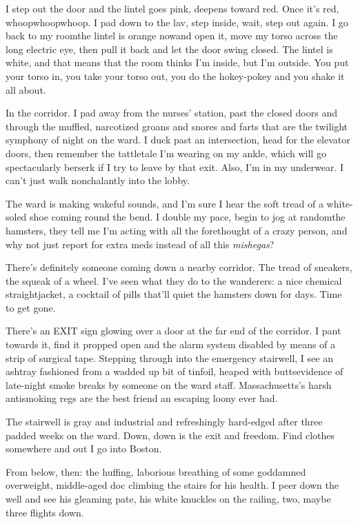 I step out the door and the lintel goes pink, deepens toward red.
Once it’s red, whoopwhoopwhoop. I pad down to the lav, step inside,
wait, step out again. I go back to my room{\dash}the lintel is orange
now{\dash}and open it, move my torso across the long electric eye, then
pull it back and let the door swing closed. The lintel is white,
and that means that the room thinks I’m inside, but I’m outside.
You put your torso in, you take your torso out, you do the
hokey-pokey and you shake it all about.

In the corridor. I pad away from the nurses’ station, past the
closed doors and through the muffled, narcotized groans and snores
and farts that are the twilight symphony of night on the ward. I
duck past an intersection, head for the elevator doors, then
remember the tattletale I’m wearing on my ankle, which will go
spectacularly berserk if I try to leave by that exit. Also, I’m in
my underwear. I can’t just walk nonchalantly into the lobby.

The ward is making wakeful sounds, and I’m sure I hear the soft
tread of a white-soled shoe coming round the bend. I double my
pace, begin to jog at random{\dash}the hamsters, they tell me I’m acting
with all the forethought of a crazy person, and why not just report
for extra meds instead of all this \emph{mishegas}?

There’s definitely someone coming down a nearby corridor. The tread
of sneakers, the squeak of a wheel. I’ve seen what they do to the
wanderers: a nice chemical straightjacket, a cocktail of pills
that’ll quiet the hamsters down for days. Time to get gone.

There’s an EXIT sign glowing over a door at the far end of the
corridor. I pant towards it, find it propped open and the alarm
system disabled by means of a strip of surgical tape. Stepping
through into the emergency stairwell, I see an ashtray fashioned
from a wadded up bit of tinfoil, heaped with butts{\dash}evidence of
late-night smoke breaks by someone on the ward staff.
Massachusetts’s harsh antismoking regs are the best friend an
escaping loony ever had.

The stairwell is gray and industrial and refreshingly hard-edged
after three padded weeks on the ward. Down, down is the exit and
freedom. Find clothes somewhere and out I go into Boston.

From below, then: the huffing, laborious breathing of some
goddamned overweight, middle-aged doc climbing the stairs for his
health. I peer down the well and see his gleaming pate, his white
knuckles on the railing, two, maybe three flights down.

